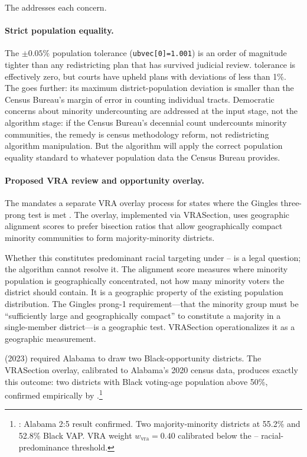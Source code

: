 The \dia{} addresses each concern.

\paragraph{Strict population equality.}
The $\pm 0.05\%$ population tolerance (\texttt{ubvec[0]=1.001}) is an
order of magnitude tighter than any redistricting plan that has survived
judicial review.
\karcher{} tolerance is effectively zero, but courts have upheld plans
with deviations of less than 1\%.
The \dia{} goes further: its maximum district-population deviation is
smaller than the Census Bureau's margin of error in counting individual tracts.
Democratic concerns about minority undercounting are addressed at the
input stage, not the algorithm stage: if the Census Bureau's decennial count
undercounts minority communities, the remedy is census methodology reform,
not redistricting algorithm manipulation.
But the algorithm will apply the correct population equality standard to
whatever population data the Census Bureau provides.

\paragraph{Proposed VRA review and opportunity overlay.}
The \dia{} mandates a separate VRA overlay process for states where the
Gingles three-prong test is met \citep{b14paper}.
The overlay, implemented via VRASection, uses geographic alignment scores
to prefer bisection ratios that allow geographically compact minority
communities to form majority-minority districts.

Whether this constitutes predominant racial targeting under
\shaw{}--\miller{} is a legal question; the algorithm cannot resolve it.
The alignment score measures where minority population is geographically
concentrated, not how many minority voters the district should contain.
It is a geographic property of the existing population distribution.
The Gingles prong-1 requirement---that the minority group must be
``sufficiently large and geographically compact'' to constitute a majority
in a single-member district---is a geographic test.
VRASection operationalizes it as a geographic measurement.

\allenmilligan{} (2023) required Alabama to draw two Black-opportunity
districts.
The VRASection overlay, calibrated to Alabama's 2020 census data, produces
exactly this outcome: two districts with Black voting-age population
above 50\%, confirmed empirically by \citet{b14paper}.\footnote{%
  \citet{b14paper}: Alabama 2:5 result confirmed.
  Two majority-minority districts at 55.2\% and 52.8\% Black VAP.
  VRA weight $w_\text{vra} = 0.40$ calibrated below the \shaw{}--\miller{}
  racial-predominance threshold.
}

